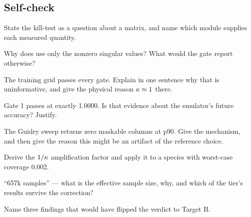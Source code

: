\subsection{Self-check}
\label{sec:selfcheck-killtest}

\begin{selfcheck}
\item State the kill-test as a question about a matrix, and name which module
  supplies each measured quantity.
\item Why does  use only the nonzero singular values?
  What would the gate report otherwise?
\item The training grid passes every gate. Explain in one sentence why that is
  uninformative, and give the physical reason $\kappa \approx 1$ there.
\item Gate 1 passes at exactly 1.0000. Is that evidence about the emulator's
  future accuracy? Justify.
\item The Guidry sweep returns zero maskable columns at p90. Give the mechanism,
  and then give the reason this might be an artifact of the reference choice.
\item Derive the $1/\kappa$ amplification factor and apply it to a species with
  worst-case coverage 0.002.
\item ``657k samples'' --- what is the effective sample size, why, and which of
  the tier's results survive the correction?
\item Name three findings that would have flipped the verdict to Target B.
\end{selfcheck}

